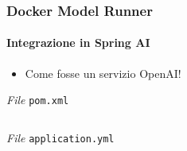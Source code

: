 %
\begin{frame}[t,fragile] \frametitle{Docker Model Runner}
    \framesubtitle{Integrazione in Spring AI}
    \begin{itemize}[leftmargin=10pt,align=right]
        \item[\alert{\faArrowCircleRight}] Come fosse un servizio \alert{OpenAI}!
    \end{itemize}
        \begin{block}{\textit{File} \texttt{pom.xml}}
			{\tiny\inputminted{xml}{code/pom.xml}}
    	\end{block}
        \begin{block}{\textit{File} \texttt{application.yml}}
			{\tiny\inputminted{yaml}{code/application.yml}}
    	\end{block}
\end{frame}